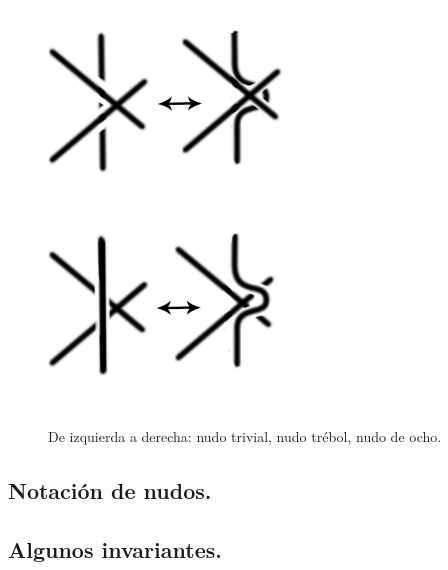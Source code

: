 \documentclass[14pt]{extarticle}
\begin{document}
      \begin{figure}[h!]
      	\includegraphics[width=7cm]{movi5.png}
      	\includegraphics[width=7cm]{movi6.png}
      	\centering
      	\caption{De izquierda a derecha: nudo trivial, nudo trébol, nudo de ocho.}
      	\label{movim3} 
      \end{figure}
  

\subsection{Notación de nudos.}
\subsection{Algunos invariantes.}



 
\end{document}
